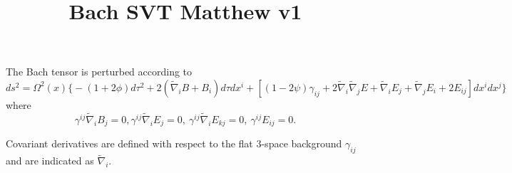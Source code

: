 \documentclass[10pt,letterpaper]{article}
\title{Bach SVT Matthew v1}
\date{}
\begin{document}
\maketitle
\noindent
The Bach tensor is perturbed according to
\begin{equation}
	ds^2 = \Omega^2(x) \big\{ -(1+2\phi) d\tau^2 + 2(\tilde\nabla_i B + B_i)d\tau dx^i + [ (1-2\psi)\gamma_{ij} + 2\tilde\nabla_i\tilde\nabla_j E + \tilde\nabla_i E_j + \tilde\nabla_j E_i + 2E_{ij}]dx^i dx^j\big\}
\end{equation}
where
\begin{equation}
	\gamma^{ij}\tilde\nabla_i B_j = 0,\gamma^{ij}\tilde\nabla_i E_j = 0,\ \gamma^{ij}\tilde\nabla_i E_{kj} = 0,\ \gamma^{ij}E_{ij} = 0.
\end{equation}

\noindent Covariant derivatives are defined with respect to the flat 3-space background $\gamma_{ij}$ and are indicated as $ \tilde\nabla_i$. 
\end{document}
